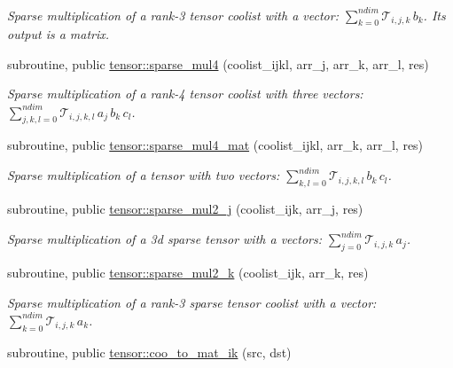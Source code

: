 \begin{DoxyCompactItemize}
\begin{DoxyCompactList}\small\item\em Sparse multiplication of a rank-\/3 tensor coolist with a vector\+: ${\displaystyle \sum_{k=0}^{ndim}} \mathcal{T}_{i,j,k} \, b_k$. Its output is a matrix. \end{DoxyCompactList}\item 
subroutine, public \hyperlink{namespacetensor_ab365e6dbb17e7fb26fef90649dd9e445}{tensor\+::sparse\+\_\+mul4} (coolist\+\_\+ijkl, arr\+\_\+j, arr\+\_\+k, arr\+\_\+l, res)
\begin{DoxyCompactList}\small\item\em Sparse multiplication of a rank-\/4 tensor coolist with three vectors\+: ${\displaystyle \sum_{j,k,l=0}^{ndim}} \mathcal{T}_{i,j,k,l} \, a_j \,b_k \, c_l $. \end{DoxyCompactList}\item 
subroutine, public \hyperlink{namespacetensor_a2fda12a024f8e3d0d6a167f264f6d000}{tensor\+::sparse\+\_\+mul4\+\_\+mat} (coolist\+\_\+ijkl, arr\+\_\+k, arr\+\_\+l, res)
\begin{DoxyCompactList}\small\item\em Sparse multiplication of a tensor with two vectors\+: ${\displaystyle \sum_{k,l=0}^{ndim}} \mathcal{T}_{i,j,k,l} \,b_k \, c_l $. \end{DoxyCompactList}\item 
subroutine, public \hyperlink{namespacetensor_ad9b09d91fb1bd425122c4f1ee2f0eb12}{tensor\+::sparse\+\_\+mul2\+\_\+j} (coolist\+\_\+ijk, arr\+\_\+j, res)
\begin{DoxyCompactList}\small\item\em Sparse multiplication of a 3d sparse tensor with a vectors\+: ${\displaystyle \sum_{j=0}^{ndim}} \mathcal{T}_{i,j,k} \, a_j $. \end{DoxyCompactList}\item 
subroutine, public \hyperlink{namespacetensor_a90e31e5e782d63d7f05ee3c9aed370e0}{tensor\+::sparse\+\_\+mul2\+\_\+k} (coolist\+\_\+ijk, arr\+\_\+k, res)
\begin{DoxyCompactList}\small\item\em Sparse multiplication of a rank-\/3 sparse tensor coolist with a vector\+: ${\displaystyle \sum_{k=0}^{ndim}} \mathcal{T}_{i,j,k} \, a_k $. \end{DoxyCompactList}\item 
subroutine, public \hyperlink{namespacetensor_a52784eb2977ec36f8ab5ba240b497633}{tensor\+::coo\+\_\+to\+\_\+mat\+\_\+ik} (src, dst)

\end{DoxyCompactItemize}

